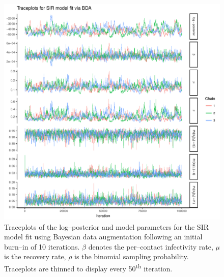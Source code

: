\begin{figure}[htbp]
	\centering
	\includegraphics[width=0.9\linewidth]{figures/sir_bda_traceplots}
	\caption{Traceplots of the log--posterior and model parameters for the SIR model fit using Bayesian data augmentation following an initial burn--in of 10 iterations. $ \beta $ denotes the per--contact infectivity rate, $ \mu $ is the recovery rate, $ \rho $ is the binomial sampling probability. Traceplots are thinned to display every 50\textsuperscript{th} iteration.}
	\label{fig:sirbdatraceplots}
\end{figure}

